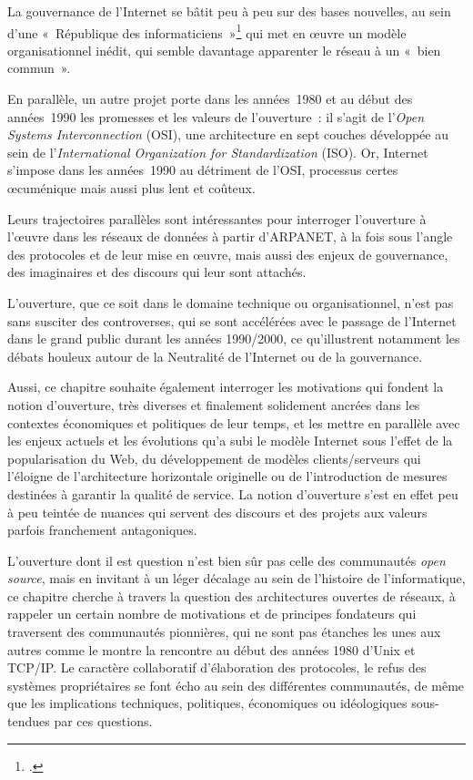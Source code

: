 \documentclass{FramateX}
\begin{document}
\begin{refsection}
La gouvernance de l'Internet se bâtit peu à peu sur des
bases nouvelles, au sein d'une «~République des
informaticiens~»\footnote{\cite[p.~90]{flichyinternet1999}.} qui met en œuvre un modèle organisationnel inédit, qui
semble davantage apparenter le réseau à un «~bien commun~». 

En parallèle, un autre projet porte dans les années~1980 et au début des
années~1990 les promesses et les valeurs de
l'ouverture~: il s'agit de
l'\textit{Open Systems Interconnection} (OSI), une
architecture en sept couches développée au sein de
l'\textit{International Organization for
Standardization} (ISO). Or, Internet s'impose dans les
années~1990 au détriment de l'OSI, processus certes
œcuménique mais aussi plus lent et coûteux. 

Leurs trajectoires parallèles sont intéressantes pour interroger
l'ouverture à l'œuvre dans les
réseaux de données à partir d'ARPANET, à la fois sous l'angle des protocoles et de leur mise
en œuvre, mais aussi des enjeux de gouvernance, des imaginaires et des discours qui leur sont attachés.

L'ouverture, que ce soit dans le domaine technique ou
organisationnel, n'est pas sans susciter des
controverses, qui se sont accélérées avec le passage de
l'Internet dans le grand public durant les années
1990/2000, ce qu'illustrent notamment les débats
houleux autour de la Neutralité de l'Internet ou de la
gouvernance.

Aussi, ce chapitre souhaite également interroger les motivations qui
fondent la notion d'ouverture, très diverses et
finalement solidement ancrées dans les contextes économiques et
politiques de leur temps, et les mettre en parallèle avec les enjeux
actuels et les évolutions qu'a subi le modèle Internet
sous l'effet de la popularisation du Web, du
développement de modèles clients/serveurs qui
l'éloigne de l'architecture
horizontale originelle ou de l'introduction de mesures
destinées à garantir la qualité de service. La notion
d'ouverture s'est en effet peu à peu
teintée de nuances qui servent des discours et des projets aux valeurs
parfois franchement antagoniques. 

L'ouverture dont il est question n'est
bien sûr pas celle des communautés \textit{open source}, mais en invitant à
un léger décalage au sein de l'histoire de
l'informatique, ce chapitre cherche à travers la
question des architectures ouvertes de réseaux, à rappeler un certain
nombre de motivations et de principes fondateurs qui traversent des
communautés pionnières, qui ne sont pas étanches les unes aux autres
comme le montre la rencontre au début des années 1980
d'Unix et TCP/IP. Le caractère collaboratif
d'élaboration des protocoles, le refus des systèmes
propriétaires se font écho au sein des différentes communautés, de même
que les implications techniques, politiques, économiques ou
idéologiques sous-tendues par ces questions. 


\end{refsection}
\end{document}
